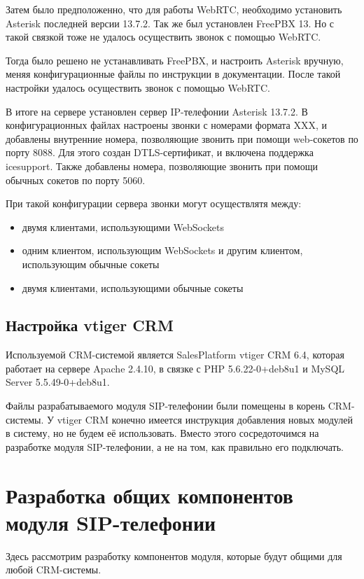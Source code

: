 Затем было предположенно, что для работы WebRTC, необходимо установить Asterisk последней версии 13.7.2. Так же был установлен FreePBX 13. Но с такой связкой тоже не удалось осуществить звонок с помощью WebRTC.

Тогда было решено не устанавливать FreePBX, и настроить Asterisk вручную, меняя конфигурационные файлы по инструкции в документации.\cite{asterisk} После такой настройки удалось осуществить звонок с помощью WebRTC.

В итоге на сервере установлен сервер IP-телефонии Asterisk 13.7.2. В конфигурационных файлах настроены звонки с номерами формата XXX, и добавлены внутренние номера, позволяющие звонить при помощи web-сокетов по порту 8088. Для этого создан DTLS-сертификат, и включена поддержка icesupport. Также добавлены номера, позволяющие звонить при помощи обычных сокетов по порту 5060.

При такой конфигурации сервера звонки могут осуществлятя между:
\begin{itemize}
\item двумя клиентами, использующими WebSockets
\item одним клиентом, использующим WebSockets и другим клиентом, использующим обычные сокеты
\item двумя клиентами, использующими обычные сокеты
\end{itemize}


\subsection{Настройка vtiger CRM}

Используемой CRM-системой является SalesPlatform vtiger CRM 6.4, которая работает на сервере Apache 2.4.10, в связке с PHP 5.6.22-0+deb8u1 и MySQL Server 5.5.49-0+deb8u1.

Файлы разрабатываемого модуля SIP-телефонии были помещены в корень CRM-системы. У vtiger CRM конечно имеется инструкция добавления новых модулей в систему, но не будем её использовать. Вместо этого сосредоточимся на разработке модуля SIP-телефонии, а не на том, как правильно его подключать.

\section{Разработка общих компонентов модуля SIP-телефонии}

Здесь рассмотрим разработку компонентов модуля, которые будут общими для любой CRM-системы.

